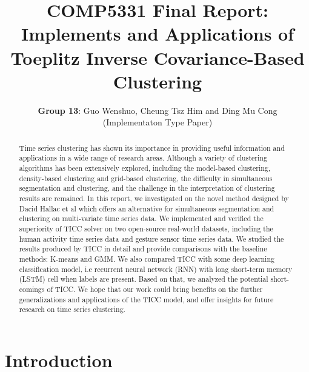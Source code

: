 \documentclass{llncs}
\begin{document}
%
\frontmatter          %
%
\pagestyle{headings}  %

\title{COMP5331 Final Report: \\ Implements and Applications of Toeplitz Inverse Covariance-Based Clustering}
\author{{\bf Group 13}: Guo Wenshuo, Cheung Tsz Him and Ding Mu Cong \\ (Implementaton Type Paper)}


\maketitle %

\begin{abstract}

Time series clustering has shown its importance in providing useful information and applications in a wide range of research areas. Although a variety of clustering algorithms has been extensively explored, including the model-based clustering, density-based clustering and grid-based clustering, the difficulty in simultaneous segmentation and clustering, and the challenge in the interpretation of clustering results are remained. In this report, we investigated on the novel method designed by Dacid Hallac et al\cite{tiic} which offers an alternative for simultaneous segmentation and clustering on multi-variate time series data. We implemented and verified the superiority of TICC solver on two open-source real-world datasets, including the human activity time series data and gesture sensor time series data. We studied the results produced by TICC in detail and provide comparisons with the baseline methods: K-means and GMM. We also compared TICC with some deep learning classification model, i.e recurrent neural network (RNN) with long short-term memory (LSTM) cell when labels are present. Based on that, we analyzed the potential short-comings of TICC. We hope that our work could bring benefits on the further generalizations and applications of the TICC model, and offer insights for future research on time series clustering.

\end{abstract}

\section{Introduction}
\end{document}
